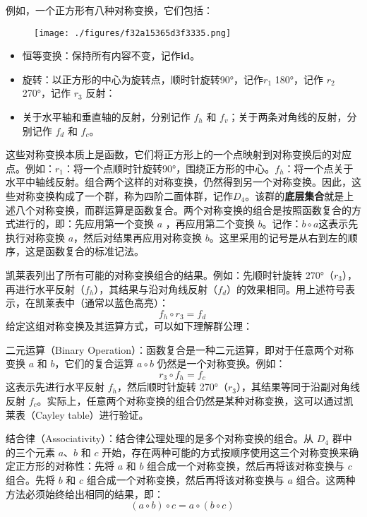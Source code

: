 例如，一个正方形有八种对称变换，它们包括：
\begin{figure}[ht]
\centering
\texttt{[image: ./figures/f32a15365d3f3335.png]}
\caption{} \label{fig_GroupM_2}
\end{figure}
\begin{itemize}
\item 恒等变换：保持所有内容不变，记作\textbf{id}。  
\item 旋转：以正方形的中心为旋转点，顺时针旋转90°，记作\( r_1 \) 180°，记作 \( r_2 \)270°，记作 \( r_3 \) 反射：  
\item 关于水平轴和垂直轴的反射，分别记作 \( f_h \) 和 \( f_v \)；关于两条对角线的反射，分别记作 \( f_d \) 和 \( f_c \)。
\end{itemize}
这些对称变换本质上是函数，它们将正方形上的一个点映射到对称变换后的对应点。例如：\( r_1 \)：将一个点顺时针旋转90°，围绕正方形的中心。\( f_h \)：将一个点关于水平中轴线反射。组合两个这样的对称变换，仍然得到另一个对称变换。因此，这些对称变换构成了一个群，称为四阶二面体群，记作\( D_4 \)。该群的\textbf{底层集合}就是上述八个对称变换，而群运算是函数复合。两个对称变换的组合是按照函数复合的方式进行的，即：先应用第一个变换 \( a \) ，再应用第二个变换 \( b \)。记作：\(b \circ a\)这表示先执行对称变换 \( a \)，然后对结果再应用对称变换 \( b \)。这里采用的记号是从右到左的顺序，这是函数复合的标准记法。

凯莱表列出了所有可能的对称变换组合的结果。例如：先顺时针旋转 270°（\( r_3 \)），再进行水平反射（\( f_h \)），其结果与沿对角线反射（\( f_d \)）的效果相同。用上述符号表示，在凯莱表中（通常以蓝色高亮）：  
\[
f_h \circ r_3 = f_d~
\]
给定这组对称变换及其运算方式，可以如下理解群公理：  

二元运算（Binary Operation）：函数复合是一种二元运算，即对于任意两个对称变换 \( a \) 和 \( b \)，它们的复合运算 \( a \circ b \) 仍然是一个对称变换。例如：  
 \[
 r_3 \circ f_h = f_c~
\]  
这表示先进行水平反射 \( f_h \)，然后顺时针旋转 270°（\( r_3 \)），其结果等同于沿副对角线反射 \( f_c \)。实际上，任意两个对称变换的组合仍然是某种对称变换，这可以通过凯莱表（Cayley table）进行验证。

结合律（Associativity）：结合律公理处理的是多个对称变换的组合。从 \( D_4 \) 群中的三个元素 \( a \)、\( b \) 和 \( c \) 开始，存在两种可能的方式按顺序使用这三个对称变换来确定正方形的对称性：先将 \( a \) 和 \( b \) 组合成一个对称变换，然后再将该对称变换与 \( c \) 组合。先将 \( b \) 和 \( c \) 组合成一个对称变换，然后再将该对称变换与 \( a \) 组合。这两种方法必须始终给出相同的结果，即：  
\[
(a \circ b) \circ c = a \circ (b \circ c)~
\]

